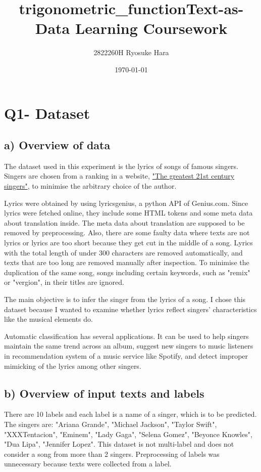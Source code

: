 \documentclass[a4paper,11pt]{article}
\title{\vspace{-10cm}trigonometric_function}
\begin{document}
\title{Text-as-Data Learning Coursework}
\author{2822260H Ryosuke Hara}
\date{\today}
\maketitle

\section{Q1- Dataset}
\subsection{a) Overview of data}%
The dataset used in this experiment is the lyrics of songs of famous singers.
Singers are chosen from a ranking in a website, \href{https://www.thefamouspeople.com/21st-century-singers.php}{"The greatest 21st century singers"}, to minimise the arbitrary choice of the author.

Lyrics were obtained by using lyricsgenius, a python API of Genius.com.
Since lyrics were fetched online, they include some HTML tokens and some meta data about translation inside.
The meta data about translation are supposed to be removed by preprocessing.
Also, there are some faulty data where texts are not lyrics or lyrics are too short because they get cut in the middle of a song.
Lyrics with the total length of under 300 characters are removed automatically, and texts that are too long are removed manually after inspection.
To minimise the duplication of the same song, songs including certain keywords, such as "remix" or "vergion", in their titles are ignored.


The main objective is to infer the singer from the lyrics of a song.
I chose this dataset because I wanted to examine whether lyrics reflect singers' characteristics like the musical elements do.

Automatic classification has several applications.
It can be used to help singers maintain the same trend across an album,
suggest new singers to music listeners in recommendation system of a music service like Spotify, and
detect improper mimicking of the lyrics among other singers. 

\subsection{b) Overview of input texts and labels}
There are 10 labels and each label is a name of a singer, which is to be predicted.
The singers are: "Ariana Grande", "Michael Jackson", "Taylor Swift", "XXXTentacion", "Eminem", "Lady Gaga", "Selena Gomez", "Beyonce Knowles", "Dua Lipa",
"Jennifer Lopez".
This dataset is not multi-label and does not consider a song from more than 2 singers.
Preprocessing of labels was unnecessary because texts were collected from a label.
\end{document}
